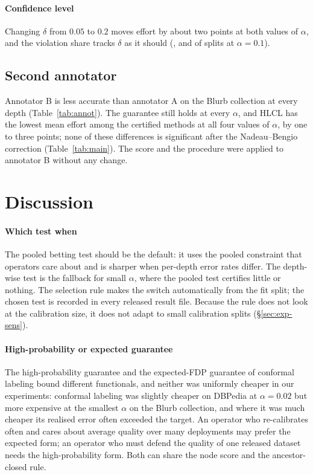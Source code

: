 \documentclass[preprint,12pt]{elsarticle}
\theoremstyle{definition}
\theoremstyle{remark}
\newcommand{\hlcl}{\textup{\textsc{HLCL}}}
\begin{document}
\paragraph{Confidence level}
Changing $\delta$ from $0.05$ to $0.2$ moves effort by about two points at both
values of $\alpha$, and the violation share tracks $\delta$ as it should
(,  and
 of splits at $\alpha=0.1$).

\subsection{Second annotator}
\label{sec:exp-annot}

Annotator B is less accurate than annotator A on the Blurb collection at every
depth (Table~\ref{tab:annot}). The guarantee still holds at every $\alpha$, and
\hlcl{} has the lowest mean effort among the certified methods at all four values
of $\alpha$, by one to three points; none of these differences is significant
after the Nadeau--Bengio correction (Table~\ref{tab:main}). The score and the procedure were
applied to annotator B without any change.

\section{Discussion}
\label{sec:discussion}

\paragraph{Which test when}
The pooled betting test should be the default: it uses the pooled constraint
that operators care about and is sharper when per-depth error rates differ.
The depth-wise test is the fallback for small $\alpha$, where the pooled test
certifies little or nothing. The selection rule makes the switch automatically from the
fit split; the chosen test is recorded in every released result file. Because
the rule does not look at the calibration size, it does not adapt to small
calibration splits (\S\ref{sec:exp-sens}).

\paragraph{High-probability or expected guarantee}
The high-probability guarantee and the expected-FDP guarantee of conformal
labeling bound different functionals, and neither was uniformly cheaper in our
experiments: conformal labeling was slightly cheaper on DBPedia at $\alpha=0.02$
but more expensive at the smallest $\alpha$ on the Blurb collection, and where it
was much cheaper its realised error often exceeded the target. An operator who
re-calibrates often and cares about average quality over many deployments may
prefer the expected form; an operator who must defend the quality of one
released dataset needs the high-probability form. Both can share the node score
and the ancestor-closed rule.
\end{document}
